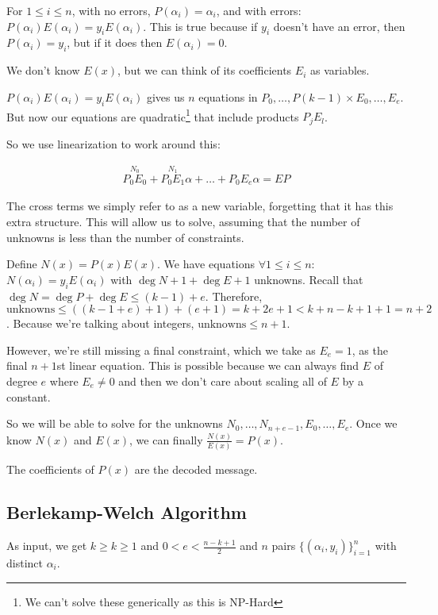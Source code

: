 \documentclass{idc_msc}
\begin{document}
For \(1 \le i \le n\), with no errors, \(P(\alpha_i) = \alpha_i\), and with errors: \(P(\alpha_i)E(\alpha_i) = y_i E(\alpha_i)\).
This is true because if \(y_i\) doesn't have an error, then \(P(\alpha_i) = y_i\), but if it does then \(E(\alpha_i) = 0\).

We don't know \(E(x)\), but we can think of its coefficients \(E_i\) as variables.

\(P(\alpha_i)E(\alpha_i) = y_i E(\alpha_i)\) gives us \(n\) equations in \(P_0,\ldots,P(k-1) \times E_0,\ldots,E_e\).
But now our equations are quadratic\footnote{We can't solve these generically as this is NP-Hard} that include products \(P_j E_l\).

So we use linearization to work around this:

\[
\begin{aligned}
\overset{N_0}{P_0E_0}+\overset{N_1}{P_0E_1}\alpha+\ldots+P_0E_e\alpha = EP
\end{aligned}
\]

The cross terms we simply refer to as a new variable, forgetting that it has this extra structure.
This will allow us to solve, assuming that the number of unknowns is less than the number of constraints.

Define \(N(x) = P(x)E(x)\).
We have equations \(\forall 1 \le i \le n\): \(N(\alpha_i) = y_i E(\alpha_i)\) with \(\deg N + 1 + \deg E + 1\) unknowns.
Recall that \(\deg N = \deg P + \deg E \le (k - 1) + e\).
Therefore, \(\text{unknowns} \le ((k-1+e)+1 )+(e+1) = k+2e+1 < k + n - k +1 + 1 = n + 2 \).
Because we're talking about integers, \(\text{unknowns} \le n+1\).

However, we're still missing a final constraint, which we take as \(E_e= 1\), as the final \(n+1\)st linear equation.
This is possible because we can always find \(E\) of degree \(e\) where \(E_e \ne 0\) and then we don't care about scaling all of \(E\) by a constant.

So we will be able to solve for the unknowns \(N_0, \ldots, N_{n+e-1}, E_0,\ldots,E_e\).
Once we know \(N(x)\) and \(E(x)\), we can finally \(\frac{N(x)}{E(x)}=P(x)\).

The coefficients of \(P(x)\) are the decoded message.

\subsection{Berlekamp-Welch Algorithm}

As input, we get \(k \ge k \ge 1\) and \(0 < e < \frac{n - k + 1}{2}\) and \(n\) pairs \(\{(\alpha_i, y_i)\}^n_{i=1}\) with distinct \(\alpha_i\).
\end{document}
